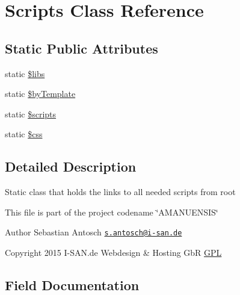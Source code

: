 \hypertarget{class_scripts}{}\section{Scripts Class Reference}
\label{class_scripts}
\subsection*{Static Public Attributes}
\begin{DoxyCompactItemize}
\item 
static \hyperlink{class_scripts_af921b61f4c24e9526d11cb2e6e274f80}{\$libs}
\item 
static \hyperlink{class_scripts_a22413c56163c8bf737718cd76a078b5c}{\$by\+Template}
\item 
static \hyperlink{class_scripts_ac1a0c3c8e4bbd9bc1a22d6147a839d75}{\$scripts}
\item 
static \hyperlink{class_scripts_ab2cede1cb181d8cd87d9a8f5570aa121}{\$css}
\end{DoxyCompactItemize}


\subsection{Detailed Description}
Static class that holds the links to all needed scripts from root

This file is part of the project codename \char`\"{}\+A\+M\+A\+N\+U\+E\+N\+S\+I\+S\char`\"{}

\begin{DoxyAuthor}{Author}
Sebastian Antosch \href{mailto:s.antosch@i-san.de}{\tt s.\+antosch@i-\/san.\+de} 
\end{DoxyAuthor}
\begin{DoxyCopyright}{Copyright}
2015 I-\/\+S\+A\+N.\+de Webdesign \& Hosting Gb\+R \hyperlink{}{G\+P\+L }
\end{DoxyCopyright}


\subsection{Field Documentation}
\hypertarget{class_scripts_af921b61f4c24e9526d11cb2e6e274f80}{}
